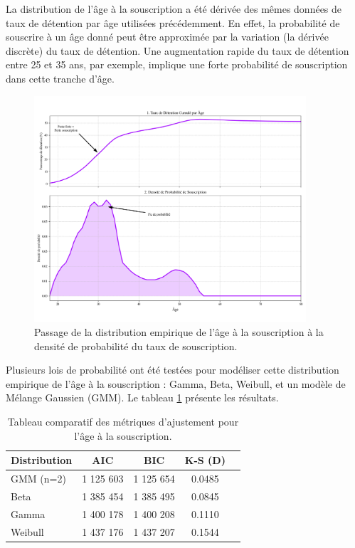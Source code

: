 La distribution de l'âge à la souscription a été dérivée des mêmes données de taux de détention par âge utilisées précédemment. En effet, la probabilité de souscrire à un âge donné peut être approximée par la variation (la dérivée discrète) du taux de détention. Une augmentation rapide du taux de détention entre 25 et 35 ans, par exemple, implique une forte probabilité de souscription dans cette tranche d'âge. 

\begin{figure}[H]
\centering
\includegraphics[width=0.9\textwidth]{images/2_chapitres/chapitre3/derivation_dist_souscription.png}
\caption{Passage de la distribution empirique de l'âge à la souscription à la densité de probabilité du taux de souscription.}

\end{figure}

Plusieurs lois de probabilité ont été testées pour modéliser cette distribution empirique de l'âge à la souscription : Gamma, Beta, Weibull, et un modèle de Mélange Gaussien (GMM). Le tableau \ref{tab:stats_souscription} présente les résultats.

\begin{table}[H]
\centering
\begin{tabular}{@{}lcccc@{}}
\toprule
\textbf{Distribution} & \textbf{AIC} & \textbf{BIC} & \textbf{K-S (D)} \\
\midrule
GMM (n=2) & 1 125 603 & 1 125 654 & 0.0485 \\
Beta & 1 385 454 & 1 385 495 & 0.0845 \\
Gamma & 1 400 178 & 1 400 208 & 0.1110 \\
Weibull & 1 437 176 & 1 437 207 & 0.1544 \\
\bottomrule
\end{tabular}
\caption{Tableau comparatif des métriques d'ajustement pour l'âge à la souscription.}
\label{tab:stats_souscription}
\end{table}


